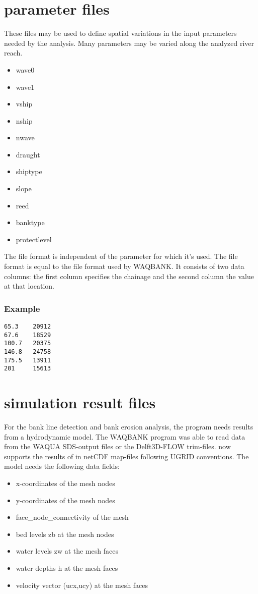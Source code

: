 \section{parameter files}

These files may be used to define spatial variations in the input parameters needed by the analysis.
Many parameters may be varied along the analyzed river reach.

\begin{itemize}
\item wave0
\item wave1
\item vship
\item nship
\item nwave
\item draught
\item shiptype
\item slope
\item reed
\item banktype
\item protectlevel
\end{itemize}

The file format is independent of the parameter for which it's used.
The file format is equal to the file format used by WAQBANK.
It consists of two data columns: the first column specifies the chainage and the second column the value at that location.

\subsubsection*{Example}

\begin{Verbatim}
65.3    20912
67.6    18529
100.7   20375
146.8   24758
175.5   13911
201     15613
\end{Verbatim}

\section{simulation result files}

For the bank line detection and bank erosion analysis, the program  needs results from a hydrodynamic model.
The WAQBANK program was able to read data from the WAQUA SDS-output files or the Delft3D-FLOW trim-files.
\dfastbe now supports the results of \dflowfm in netCDF map-files following UGRID conventions.
The model needs the following data fields:

\begin{itemize}
\item x-coordinates of the mesh nodes
\item y-coordinates of the mesh nodes
\item face\_node\_connectivity of the mesh
\item bed levels zb at the mesh nodes
\item water levels zw at the mesh faces
\item water depths h at the mesh faces
\item velocity vector (ucx,ucy) at the mesh faces
\end{itemize}

